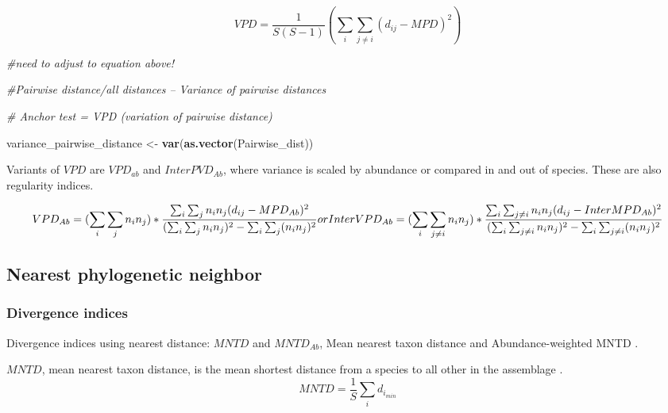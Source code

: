 \documentclass[]{book}
\newenvironment{Shaded}{\begin{snugshade}}{\end{snugshade}}
\newcommand{\KeywordTok}[1]{\textcolor[rgb]{0.13,0.29,0.53}{\textbf{{#1}}}}
\newcommand{\StringTok}[1]{\textcolor[rgb]{0.31,0.60,0.02}{{#1}}}
\newcommand{\CommentTok}[1]{\textcolor[rgb]{0.56,0.35,0.01}{\textit{{#1}}}}
\newcommand{\NormalTok}[1]{{#1}}
\theoremstyle{definition}
\theoremstyle{definition}
\theoremstyle{remark}
\begin{document}
\[VPD = \dfrac{1}{S(S-1)} (\sum_{i} \sum_{j \ne i} {(d_{ij} - MPD)^2})\]

\begin{Shaded}
\begin{Highlighting}[]
\CommentTok{#need to adjust to equation above!}

\CommentTok{#Pairwise distance/all distances -- Variance of pairwise distances}

\CommentTok{# Anchor test = VPD (variation of pairwise distance)  }

\NormalTok{variance_pairwise_distance <-}\StringTok{ }\KeywordTok{var}\NormalTok{(}\KeywordTok{as.vector}\NormalTok{(Pairwise_dist))}
\end{Highlighting}
\end{Shaded}

Variants of \(VPD\) are \(VPD_{ab}\) and \(InterPVD_{Ab}\), where
variance is scaled by abundance or compared in and out of species. These
are also regularity indices.

\[
VPD_{Ab}= 
(\sum_{i} \sum_{j} n_{i} n_{j}) *
\dfrac{\sum_{i} \sum_{j} n_{i} n_{j} (d_{ij} - MPD_{Ab})^2}
{(\sum_{i} \sum_{j} n_{i} n_{j})^2 - \sum_{i} \sum_{j} (n_{i} n_{j})^2}
\\
or
\\
InterVPD_{Ab} = 
(\sum_{i} \sum_{j \ne i} n_{i} n_{j}) *
\dfrac{\sum_{i} \sum_{j \ne i} n_{i} n_{j} (d_{ij} - InterMPD_{Ab})^2}
{(\sum_{i} \sum_{j \ne i} n_{i} n_{j})^2 - \sum_{i} \sum_{j \ne i} (n_{i} n_{j})^2}
\]

\hypertarget{nearest-phylogenetic-neighbor}{\subsection{Nearest
phylogenetic neighbor}\label{nearest-phylogenetic-neighbor}}

\subsubsection{Divergence indices}\label{divergence-indices}

Divergence indices using nearest distance: \(MNTD\) and \(MNTD_{Ab}\),
Mean nearest taxon distance and Abundance-weighted MNTD
\citep{Webb2002, Webb2008, Kembel2010}.

\(MNTD\), mean nearest taxon distance, is the mean shortest distance
from a species to all other in the assemblage
\citep{Webb2002, Webb2008, Kembel2010}.\\
\[
MNTD = 
\dfrac{1}{S}
\sum_{i}
d_{i_{min}}
\]
\end{document}
